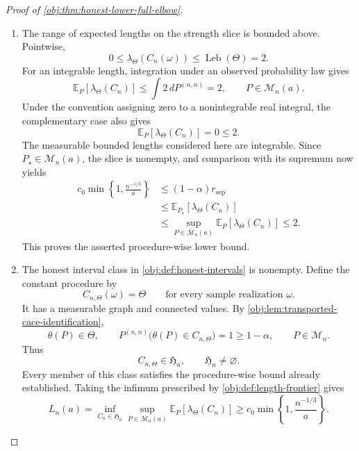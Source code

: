 \documentclass[11pt]{article}
\begin{document}
\begin{proof}[Proof of \cref{obj:thm:honest-lower-full-elbow}]
\begin{enumerate}
\item The range of expected lengths on the strength slice is bounded above. Pointwise,
\[
0\le\lambda_{\Theta}(C_n(\omega))
\le\operatorname{Leb}(\Theta)=2.
\]
For an integrable length, integration under an observed probability law gives
\[
\mathbb E_P\!\left[\lambda_{\Theta}(C_n)\right]
\le\int 2\,dP^{(n,n)}=2,
\qquad P\in\mathcal M_n(a).
\]
Under the convention assigning zero to a nonintegrable real integral, the complementary case also gives
\[
\mathbb E_P\!\left[\lambda_{\Theta}(C_n)\right]=0\le2.
\]
The measurable bounded lengths considered here are integrable. Since \(P_{\star}\in\mathcal M_n(a)\), the slice is nonempty, and comparison with its supremum now yields
\[
\begin{aligned}
c_0\min\left\{1,\frac{n^{-1/3}}a\right\}
&\le(1-\alpha)r_{\mathrm{sep}}\\
&\le\mathbb E_{P_{\star}}
       \!\left[\lambda_{\Theta}(C_n)\right]\\
&\le\sup_{P\in\mathcal M_n(a)}
       \mathbb E_P\!\left[\lambda_{\Theta}(C_n)\right]
\le2.
\end{aligned}
\]
This proves the asserted procedure-wise lower bound.

\item The honest interval class in \cref{obj:def:honest-intervals} is nonempty. Define the constant procedure by
\[
C_{n,\Theta}(\omega)=\Theta
\qquad\text{for every sample realization }\omega.
\]
It has a measurable graph and connected values. By \cref{obj:lem:transported-cace-identification},
\[
\theta(P)\in\Theta,
\qquad
P^{(n,n)}\bigl(\theta(P)\in C_{n,\Theta}\bigr)
=1\ge1-\alpha,
\qquad P\in\mathcal M_n.
\]
Thus
\[
C_{n,\Theta}\in\mathfrak H_n,
\qquad
\mathfrak H_n\ne\varnothing.
\]
Every member of this class satisfies the procedure-wise bound already established. Taking the infimum prescribed by \cref{obj:def:length-frontier} gives
\[
L_n(a)
=
\inf_{C_n\in\mathfrak H_n}
\sup_{P\in\mathcal M_n(a)}
\mathbb E_P\!\left[\lambda_{\Theta}(C_n)\right]
\ge
c_0\min\left\{1,\frac{n^{-1/3}}a\right\}.
\]
\end{enumerate}
\end{proof}




\end{document}
